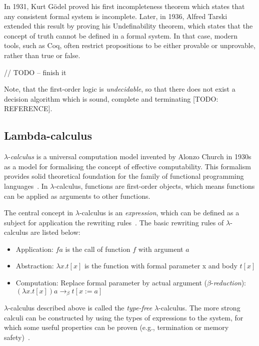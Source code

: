 \documentclass[article]{aaltoseries}
\begin{document}
In 1931, Kurt Gödel proved his first incompleteness theorem which states that any consistent formal system is incomplete. Later, in 1936, Alfred Tarski extended this result by proving his Undefinability theorem, which states that the concept of truth cannot be defined in a formal system. %
In that case, modern tools, such as Coq, often restrict propositions to be either provable or unprovable, rather than true or false.


// TODO -- finish it


Note, that the first-order logic is \textit{undecidable}, so that there does not exist a decision algorithm which is sound, complete and terminating [TODO: REFERENCE]. %


\subsection{Lambda-calculus}

$\lambda$-\textit{calculus} is a universal computation model invented by Alonzo Church in 1930s as a model for formalising the concept of effective computability.  This formalism provides solid theoretical foundation for the family of functional programming languages~\cite{Roj15}. In $\lambda$-calculus, functions are first-order objects, which means functions can be applied as arguments to other functions.

The central concept in $\lambda$-calculus is an \textit{expression}, which can be defined as a subject for application the rewriting rules~\cite{Bar88}. The basic rewriting rules of $\lambda$-calculus are listed below:

\begin{itemize}
\itemsep0em
	\item Application:
	$f a$ is the call of function $f$ with argument $a$
	
	\item Abstraction:
	$\lambda x.t[x]$ is the function with formal parameter x and body $t[x]$
	
	\item Computation:
	Replace formal parameter by actual argument ($\beta$-\textit{reduction}): \\
	$(\lambda x.t[x]) a \rightarrow_{\beta} t[x:=a]$
\end{itemize}

$\lambda$-calculus described above is called the \textit{type-free} $\lambda$-calculus. The more strong calculi can be constructed by using the types of expressions to the system, for which some useful properties can be proven (e.g., termination or memory safety)~\cite{Bar13}.
\end{document}
